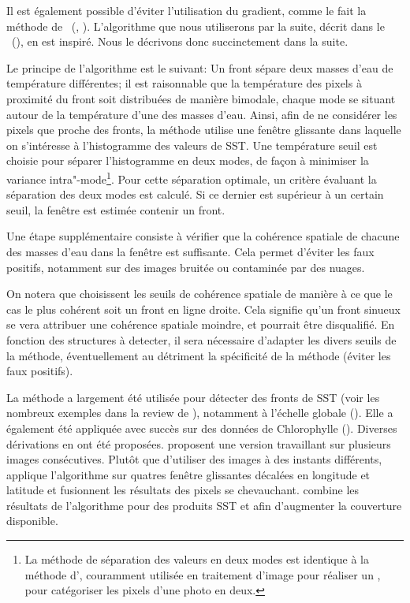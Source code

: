 Il est également possible d'éviter l'utilisation du gradient, comme le fait la méthode de ~(, \cite{cayula_1992}).
L'algorithme que nous utiliserons par la suite, décrit dans le ~(), en est inspiré. Nous le décrivons donc succinctement dans la suite.

Le principe de l'algorithme  est le suivant: Un front sépare deux masses d'eau de température différentes; il est raisonnable que la température des pixels à proximité du front soit distribuées de manière bimodale, chaque mode se situant autour de la température d'une des masses d'eau.
Ainsi, afin de ne considérer les pixels que proche des fronts, la méthode utilise une fenêtre glissante dans laquelle on s'intéresse à l'histogramme des valeurs de SST.
Une température seuil est choisie pour séparer l'histogramme en deux modes, de façon à minimiser la variance intra"-mode\footnote{%
  La méthode de séparation des valeurs en deux modes est identique à la méthode d'\textcite{otsu_1979}, couramment utilisée en traitement d'image pour réaliser un ,  pour catégoriser les pixels d'une photo en deux.
}.
Pour cette séparation optimale, un critère évaluant la séparation des deux modes est calculé. Si ce dernier est supérieur à un certain seuil, la fenêtre est estimée contenir un front.

Une étape supplémentaire consiste à vérifier que la cohérence spatiale de chacune des masses d'eau dans la fenêtre est suffisante.
Cela permet d'éviter les faux positifs, notamment sur des images bruitée ou contaminée par des nuages.

\begin{note}
  On notera que \textcite{cayula_1992} choisissent les seuils de cohérence spatiale de manière à ce que le cas le plus cohérent soit un front en ligne droite.
  Cela signifie qu'un front sinueux se vera attribuer une cohérence spatiale moindre, et pourrait être disqualifié.
  En fonction des structures à detecter, il sera nécessaire d'adapter les divers seuils de la méthode, éventuellement au détriment la spécificité de la méthode (éviter les faux positifs).
\end{note}

La méthode  a largement été utilisée pour détecter des fronts de SST (voir les nombreux exemples dans la review de \cite{belkin_2021}), notamment à l'échelle globale (\cite{belkin_2009a, belkin_2007}).
Elle a également été appliquée avec succès sur des données de Chlorophylle (\cite{stegmann_2004, kahru_2012, bontempi_2004}).
Diverses dérivations en ont été proposées.
\textcite{cayula_1995} proposent une version travaillant sur plusieurs images consécutives.
Plutôt que d'utiliser des images à des instants différents, \textcite{nieto_2012} applique l'algorithme  sur quatres fenêtre glissantes décalées en longitude et latitude et fusionnent les résultats des pixels se chevauchant.
\textcite{miller_2009} combine les résultats de l'algorithme  pour des produits SST et  afin d'augmenter la couverture disponible.


